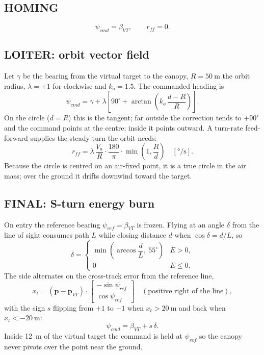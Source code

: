 \documentclass[11pt,a4paper]{article}
\newcommand{\vect}[1]{\mathbf{#1}}
\begin{document}
\subsection{HOMING}
\begin{equation}
  \psi_{cmd} = \beta_{VT}, \qquad r_{ff} = 0 .
\end{equation}

\subsection{LOITER: orbit vector field}
Let $\gamma$ be the bearing from the virtual target to the canopy,
$R = \SI{50}{\meter}$ the orbit radius, $\lambda = +1$ for clockwise and
$k_o = 1.5$. The commanded heading is
\begin{equation}
  \psi_{cmd} = \gamma + \lambda\left[90^\circ + \arctan\!\left(k_o\,\frac{d - R}{R}\right)\right].
\end{equation}
On the circle ($d = R$) this is the tangent; far outside the correction tends
to $+90^\circ$ and the command points at the centre; inside it points
outward. A turn-rate feed-forward supplies the steady turn the orbit needs:
\begin{equation}
  r_{ff} = \lambda\,\frac{V_a}{R}\cdot\frac{180}{\pi}\cdot\min\!\left(1, \frac{R}{d}\right) \quad [\si{\degree\per\second}].
\end{equation}
Because the circle is centred on an air-fixed point, it is a true circle in
the air mass; over the ground it drifts downwind toward the target.

\subsection{FINAL: S-turn energy burn}
On entry the reference bearing $\psi_{ref} = \beta_{VT}$ is frozen. Flying at
an angle $\delta$ from the line of sight consumes path $L$ while closing
distance $d$ when $\cos\delta = d/L$, so
\begin{equation}
  \delta = \begin{cases} \min\!\left(\arccos\dfrac{d}{L},\ 55^\circ\right) & E > 0,\\[4pt] 0 & E \le 0 .\end{cases}
\end{equation}
The side alternates on the cross-track error from the reference line,
\begin{equation}
  x_t = (\vect p - \vect p_{VT})\cdot\begin{bmatrix}-\sin\psi_{ref}\\ \cos\psi_{ref}\end{bmatrix}
  \quad(\text{positive right of the line}),
\end{equation}
with the sign $s$ flipping from $+1$ to $-1$ when $x_t > \SI{20}{\meter}$ and
back when $x_t < -\SI{20}{\meter}$:
\begin{equation}
  \psi_{cmd} = \beta_{VT} + s\,\delta .
\end{equation}
Inside \SI{12}{\meter} of the virtual target the command is held at
$\psi_{ref}$ so the canopy never pivots over the point near the ground.
\end{document}
